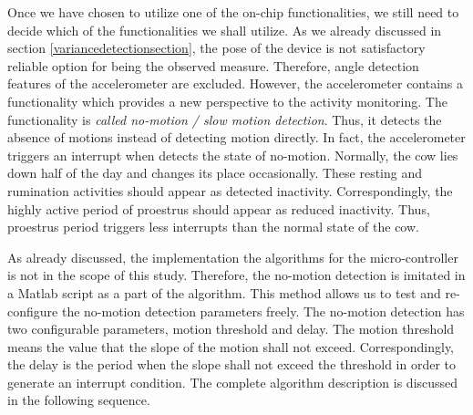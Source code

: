 \documentclass[english,12pt,a4paper,pdftex,elec,utf8]{aaltothesis}
\begin{document}
Once we have chosen to utilize one of the on-chip functionalities, we still need to decide which of the functionalities we shall utilize. As we already discussed in section \ref{variancedetectionsection}, the pose of the device is not satisfactory reliable option for being the observed measure. Therefore, angle detection features of the accelerometer are excluded. However, the accelerometer contains a functionality which provides a new perspective to the activity monitoring. The functionality is \textit{called no-motion / slow motion detection}. Thus, it detects the absence of motions instead of detecting motion directly. In fact, the accelerometer triggers an interrupt when detects the state of no-motion. Normally, the cow lies down half of the day and changes its place occasionally. These resting and rumination activities should appear as detected inactivity. Correspondingly, the highly active period of proestrus should appear as reduced inactivity.  Thus, proestrus period triggers less interrupts than the normal state of the cow.

As already discussed, the implementation the algorithms for the micro-controller is not in the scope of this study. Therefore, the no-motion detection is imitated in a Matlab script as a part of the algorithm. This method allows us to test and re-configure the no-motion detection parameters freely. The no-motion detection has two configurable parameters, motion threshold and delay. The motion threshold means the value that the slope of the motion shall not exceed. Correspondingly, the delay is the period when the slope shall not exceed the threshold in order to generate an interrupt condition. The complete algorithm description is discussed in the following sequence.
\end{document}
